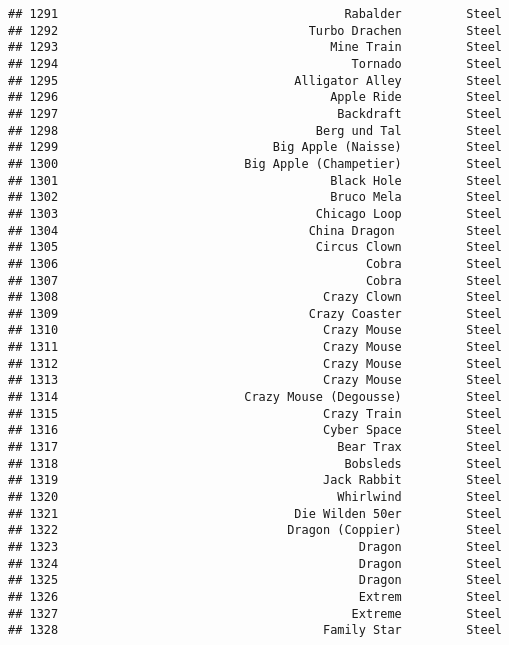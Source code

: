 \documentclass[
]{article}
\begin{document}
\begin{verbatim}
## 1291                                        Rabalder         Steel
## 1292                                   Turbo Drachen         Steel
## 1293                                      Mine Train         Steel
## 1294                                         Tornado         Steel
## 1295                                 Alligator Alley         Steel
## 1296                                      Apple Ride         Steel
## 1297                                       Backdraft         Steel
## 1298                                    Berg und Tal         Steel
## 1299                              Big Apple (Naisse)         Steel
## 1300                          Big Apple (Champetier)         Steel
## 1301                                      Black Hole         Steel
## 1302                                      Bruco Mela         Steel
## 1303                                    Chicago Loop         Steel
## 1304                                   China Dragon          Steel
## 1305                                    Circus Clown         Steel
## 1306                                           Cobra         Steel
## 1307                                           Cobra         Steel
## 1308                                     Crazy Clown         Steel
## 1309                                   Crazy Coaster         Steel
## 1310                                     Crazy Mouse         Steel
## 1311                                     Crazy Mouse         Steel
## 1312                                     Crazy Mouse         Steel
## 1313                                     Crazy Mouse         Steel
## 1314                          Crazy Mouse (Degousse)         Steel
## 1315                                     Crazy Train         Steel
## 1316                                     Cyber Space         Steel
## 1317                                       Bear Trax         Steel
## 1318                                        Bobsleds         Steel
## 1319                                     Jack Rabbit         Steel
## 1320                                       Whirlwind         Steel
## 1321                                 Die Wilden 50er         Steel
## 1322                                Dragon (Coppier)         Steel
## 1323                                          Dragon         Steel
## 1324                                          Dragon         Steel
## 1325                                          Dragon         Steel
## 1326                                          Extrem         Steel
## 1327                                         Extreme         Steel
## 1328                                     Family Star         Steel

\end{verbatim}
\end{document}
